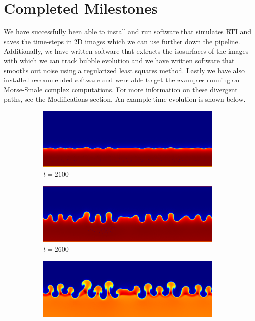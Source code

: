 \documentclass[12pt, fullpage,letterpaper]{article}
\begin{document}
	\section*{\normalfont Completed Milestones} We have successfully been able to install and run software that simulates RTI and saves the time-steps in 2D images which we can use further down the pipeline. Additionally, we have written software that extracts the isosurfaces of the images with which we can track bubble evolution and we have written software that smooths out noise using a regularized least squares method. Lastly we have also installed recommended software and were able to get the examples running on Morse-Smale complex computations. For more information on these divergent paths, see the Modifications section. An example time evolution is shown below.
		\begin{figure}[ht!]
		\centering
		\begin{subfigure}
			\centering
			\includegraphics[scale = .25]{fig1.png}
			\caption{$t = 2100$}
		\end{subfigure}
		\begin{subfigure}
			\centering
			\includegraphics[scale = .25]{fig2.png}
			\caption{$t = 2600$}
		\end{subfigure}
		\begin{subfigure}
			\centering
			\includegraphics[scale = .25]{fig3.png}

\end{subfigure}
\end{figure}
\end{document}
